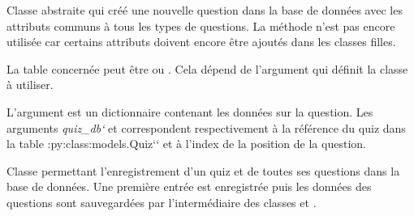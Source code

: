 \documentclass[a4,10pt,french]{sphinxmanual}
\begin{document}
\begin{fulllineitems}
\label{source:quiz.utils.save.SaveQuestion}
Classe abstraite qui créé une nouvelle question dans la base de données avec
les attributs communs à tous les types de questions. La méthode 
n'est pas encore utilisée car certains attributs doivent encore être ajoutés
dans les classes filles.

La table concernée peut être  ou .
Cela dépend de l'argument  qui définit la classe à utiliser.

L'argument  est un dictionnaire contenant les données sur la question.
Les arguments \emph{quiz\_db{}`} et  correspondent respectivement à la référence
du quiz dans la table :py:class:models.Quiz{}`{}` et à l'index de la position
de la question.

\end{fulllineitems}


\begin{fulllineitems}
\label{source:quiz.utils.save.SaveQuiz}
Classe permettant l'enregistrement d'un quiz et de toutes ses questions dans
la base de données. Une première entrée  est enregistrée
puis les données des questions sont sauvegardées par l'intermédiaire des classes
{\hyperref[source:quiz.utils.save.SaveSimpleQuestion]{\emph{}}} et {\hyperref[source:quiz.utils.save.SaveQcm]{\emph{}}}.

\end{fulllineitems}

\end{document}
